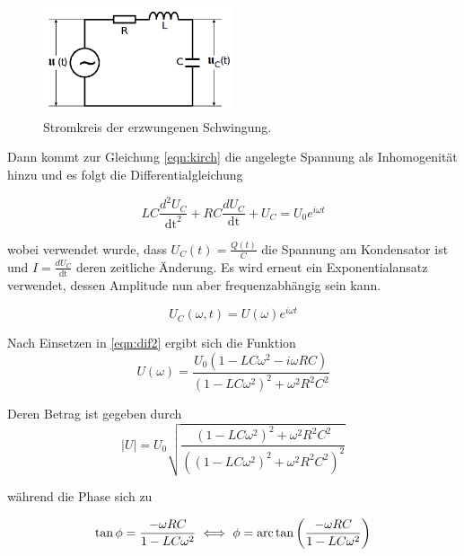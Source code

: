     \begin{figure}
        \centering
        \includegraphics[width=0.5\textwidth]{erzwungen.png}
        \caption{Stromkreis der erzwungenen Schwingung.}
        \label{fig:schwingschwing}
    \end{figure}

    \noindent Dann kommt zur Gleichung \eqref{eqn:kirch} die angelegte Spannung
    als Inhomogenität hinzu und es folgt die Differentialgleichung
    
    \begin{equation}
        LC \frac{d^2 U_C}{\text{dt}^2} + RC \frac{d U_C}{\text{dt}} + U_C = U_0 e^{i \omega t}
        \label{eqn:dif2}
    \end{equation}

    \noindent wobei verwendet wurde, dass $U_C (t) = \frac{Q(t)}{C}$ die Spannung am 
    Kondensator ist und $I = \frac{d U_C}{\text{dt}}$ deren zeitliche Änderung.
    Es wird erneut ein Exponentialansatz verwendet, dessen Amplitude nun aber 
    frequenzabhängig sein kann.

    \begin{equation}
        U_C(\omega, t) = U(\omega) e^{i \omega t}
        \label{eqn:ansatz}
    \end{equation}

    \noindent Nach Einsetzen in \eqref{eqn:dif2} ergibt sich die Funktion
    \begin{equation*}
        U(\omega) = \frac{U_0 \left( 1 - LC \omega^2 - i \omega RC\right)}
        {\left(1 - LC \omega^2\right)^2 + \omega^2 R^2 C^2}
    \end{equation*}
    
    \noindent Deren Betrag ist gegeben durch 
    \begin{equation}
        |U| = U_0 \sqrt{\frac{\left(1 - LC \omega^2\right)^2 + \omega^2 R^2 C^2}
        {\left(\left( 1 - LC \omega^2\right)^2 + \omega^2 R^2 C^2\right)^2}}
    \end{equation}

    \noindent während die Phase sich zu 
    
    \begin{equation}
        \tan \phi = \frac{- \omega R C}{1 - LC \omega^2}\\
        \iff \phi = \text{arc} \tan\left(\frac{- \omega R C}{1-LC \omega^2}\right)
    \end{equation}


